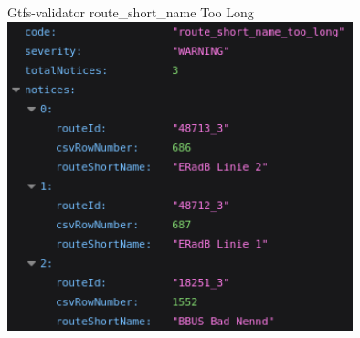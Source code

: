 \begin{frame}{Gtfs-validator route\_short\_name Too Long}
\includegraphics[width=0.75\textwidth]{gtfs-validation/gtfs-validator-report-short-name-too-long.png}
\end{frame}
